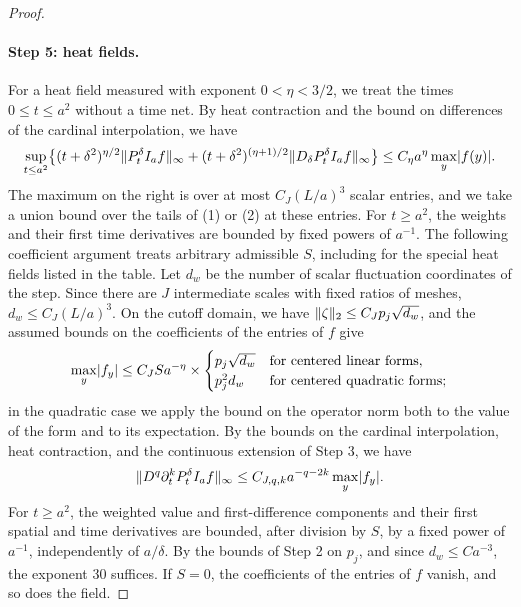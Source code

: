 \begin{proof}
\paragraph{Step 5: heat fields.}
For a heat field measured with exponent $0<\eta<3/2$, we treat the times $0\le t\le a^2$ without a time net. By heat contraction and the bound on differences of the cardinal interpolation, we have
\[
 \sup_{t\le a^2}\bigl\{(t+\delta^2)^{\eta/2}\lVert P_t^\delta I_af\rVert_\infty+(t+\delta^2)^{(\eta+1)/2}\lVert D_\delta P_t^\delta I_af\rVert_\infty\bigr\}\le C_\eta a^\eta\max_y\lvert f(y)\rvert.
\]
The maximum on the right is over at most $C_J(L/a)^3$ scalar entries, and we take a union bound over the tails of (1) or (2) at these entries. For $t\ge a^2$, the weights and their first time derivatives are bounded by fixed powers of $a^{-1}$. The following coefficient argument treats arbitrary admissible $S$, including for the special heat fields listed in the table. Let $d_w$ be the number of scalar fluctuation coordinates of the step. Since there are $J$ intermediate scales with fixed ratios of meshes, $d_w\le C_J(L/a)^3$. On the cutoff domain, we have $\lVert \zeta\rVert_2\le C_Jp_j\sqrt{d_w}$, and the assumed bounds on the coefficients of the entries of $f$ give
\[
 \max_y\lvert f_y\rvert\le C_JSa^{-\eta}\times
 \begin{cases}
 p_j\sqrt{d_w}&\text{for centered linear forms},\\
 p_j^2d_w&\text{for centered quadratic forms};
 \end{cases}
\]
in the quadratic case we apply the bound on the operator norm both to the value of the form and to its expectation. By the bounds on the cardinal interpolation, heat contraction, and the continuous extension of Step 3, we have
\[
 \lVert D^q\partial_t^kP_t^\delta I_af\rVert_\infty\le C_{J,q,k}a^{-q-2k}\max_y\lvert f_y\rvert.
\]
For $t\ge a^2$, the weighted value and first-difference components and their first spatial and time derivatives are bounded, after division by $S$, by a fixed power of $a^{-1}$, independently of $a/\delta$. By the bounds of Step 2 on $p_j$, and since $d_w\le Ca^{-3}$, the exponent $30$ suffices. If $S=0$, the coefficients of the entries of $f$ vanish, and so does the field.


\end{proof}
